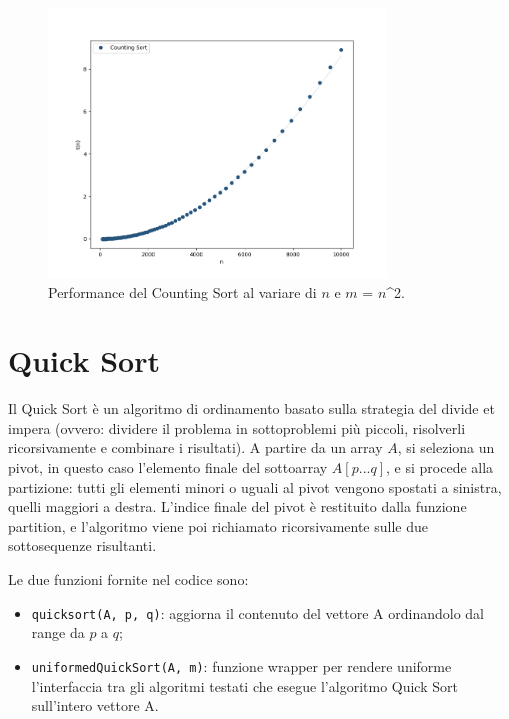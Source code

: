 \documentclass[a4paper, 12pt, oneside]{book}
\begin{document}
\begin{figure}[H]
    \centering
    \includegraphics[width=0.8\textwidth]{images/countingSortQuadratico.png}
    \caption{Performance del Counting Sort al variare di \(n\) e \(m\) = \(n\)^2.}
    \label{fig:counting_sort_m}
\end{figure}


\chapter{Quick Sort}\label{chap:Quick Sort} %

Il Quick Sort è un algoritmo di ordinamento basato sulla strategia del divide et impera (ovvero: dividere il problema in sottoproblemi più piccoli, risolverli ricorsivamente e combinare i risultati).
A partire da un array \(A\), si seleziona un pivot, in questo caso l'elemento finale del sottoarray \(A[p...q]\), e si procede alla partizione: tutti gli elementi minori o uguali al pivot vengono spostati a sinistra, quelli maggiori a destra. L'indice finale del pivot è restituito dalla funzione partition, e l'algoritmo viene poi richiamato ricorsivamente sulle due sottosequenze risultanti.


\noindent Le due funzioni fornite nel codice sono:

\begin{itemize}
    \item \texttt{quicksort(A, p, q)}: aggiorna il contenuto del vettore A ordinandolo dal range da $p$ a $q$;
    \item \texttt{uniformedQuickSort(A, m)}: funzione wrapper per rendere uniforme l'interfaccia tra gli algoritmi testati che esegue l'algoritmo Quick Sort sull'intero vettore A.
\end{itemize}
\end{document}
